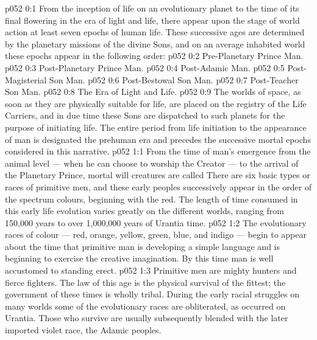\author{Mighty Messenger}
\vs p052 0:1 From the inception of life on an evolutionary planet to the time of its final flowering in the era of light and life, there appear upon the stage of world action at least seven epochs of human life. These successive ages are determined by the planetary missions of the divine Sons, and on an average inhabited world these epochs appear in the following order:
\vs p052 0:2 \bibnobreakspace Pre\hyp{}Planetary Prince Man.
\vs p052 0:3 \bibnobreakspace Post\hyp{}Planetary Prince Man.
\vs p052 0:4 \bibnobreakspace Post\hyp{}Adamic Man.
\vs p052 0:5 \bibnobreakspace Post\hyp{}Magisterial Son Man.
\vs p052 0:6 \bibnobreakspace Post\hyp{}Bestowal Son Man.
\vs p052 0:7 \bibnobreakspace Post\hyp{}Teacher Son Man.
\vs p052 0:8 \bibnobreakspace The Era of Light and Life.
\vs p052 0:9 \pc The worlds of space, as soon as they are physically suitable for life, are placed on the registry of the Life Carriers, and in due time these Sons are dispatched to such planets for the purpose of initiating life. The entire period from life initiation to the appearance of man is designated the prehuman era and precedes the successive mortal epochs considered in this narrative.
\vs p052 1:1 From the time of man’s emergence from the animal level --- when he can choose to worship the Creator --- to the arrival of the Planetary Prince, mortal will creatures are called  There are six basic types or races of primitive men, and these early peoples successively appear in the order of the spectrum colours, beginning with the red. The length of time consumed in this early life evolution varies greatly on the different worlds, ranging from 150,000 years to over 1,000,000 years of Urantia time.
\vs p052 1:2 The evolutionary races of colour --- red, orange, yellow, green, blue, and indigo --- begin to appear about the time that primitive man is developing a simple language and is beginning to exercise the creative imagination. By this time man is well accustomed to standing erect.
\vs p052 1:3 \pc Primitive men are mighty hunters and fierce fighters. The law of this age is the physical survival of the fittest; the government of these times is wholly tribal. During the early racial struggles on many worlds some of the evolutionary races are obliterated, as occurred on Urantia. Those who survive are usually subsequently blended with the later imported violet race, the Adamic peoples.
